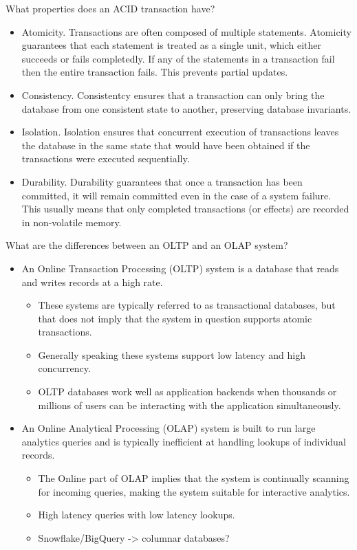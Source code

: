 \begin{questions}
\question What properties does an ACID transaction have?
\begin{solution}
\begin{itemize}
    \item Atomicity. Transactions are often composed of multiple statements. Atomicity guarantees that each statement is treated as a single unit, which either succeeds or fails completedly. If any of the statements in a transaction fail then the entire transaction fails. This prevents partial updates.
    \item Consistency. Consistentcy ensures that a transaction can only bring the database from one consistent state to another, preserving database invariants.
    \item Isolation. Isolation ensures that concurrent execution of transactions leaves the database in the same state that would have been obtained if the transactions were executed sequentially.
    \item Durability. Durability guarantees that once a transaction has been committed, it will remain committed even in the case of a system failure. This usually means that only completed transactions (or effects) are recorded in non-volatile memory.
\end{itemize}
\end{solution}

\question What are the differences between an OLTP and an OLAP system?
\begin{solution}
\begin{itemize}
    \item An Online Transaction Processing (OLTP) system is a database that reads and writes records at a high rate.
    \begin{itemize}
        \item These systems are typically referred to as transactional databases, but that does not imply that the system in question supports atomic transactions.
        \item Generally speaking these systems support low latency and high concurrency.
        \item OLTP databases work well as application backends when thousands or millions of users can be interacting with the application simultaneously.
    \end{itemize}
    \item An Online Analytical Processing (OLAP) system is built to run large analytics queries and is typically inefficient at handling lookups of individual records.
    \begin{itemize}
        \item The Online part of OLAP implies that the system is continually scanning for incoming queries, making the system suitable for interactive analytics.
        \item High latency queries with low latency lookups.
        \item Snowflake/BigQuery -> columnar databases?
    \end{itemize}
\end{itemize}   
\end{solution}


\end{questions}
